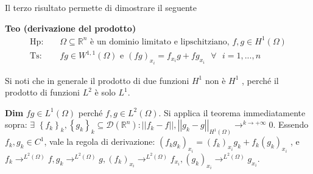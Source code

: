 \documentclass{article}
\begin{document}
Il terzo risultato permette di dimostrare il seguente

\textbf{Teo (derivazione del prodotto)}%
\begin{eqnarray*}
\text{Hp}\text{: } &&\Omega \subseteq 
\mathbb{R}
^{n}\text{ \`{e} un dominio limitato e lipschitziano, }f,g\in H^{1}\left(
\Omega \right) \\
\text{Ts}\text{: } &&fg\in W^{1,1}\left( \Omega \right) \text{ e }\left(
fg\right) _{x_{i}}=f_{x_{i}}g+fg_{x_{i}}\text{ }\forall \text{ }i=1,...,n
\end{eqnarray*}

Si noti che in generale il prodotto di due funzioni $H^{1}$ non \`{e} $H^{1}$%
, perch\'{e} il prodotto di funzioni $L^{2}$ \`{e} solo $L^{1}$.

\textbf{Dim} $fg\in L^{1}\left( \Omega \right) $ perch\'{e} $f,g\in
L^{2}\left( \Omega \right) $. Si applica il teorema immediatamente sopra: $%
\exists $ $\left\{ f_{k}\right\} _{k},\left\{ g_{k}\right\} _{k}\subseteq 
\mathcal{D}\left( 
\mathbb{R}
^{n}\right) :\left\vert \left\vert f_{k}-f\right\vert \right\vert
,\left\vert \left\vert g_{k}-g\right\vert \right\vert _{H^{1}\left( \Omega
\right) }\rightarrow ^{k\rightarrow +\infty }0$. Essendo $f_{k},g_{k}\in
C^{1}$, vale la regola di derivazione: $\left( f_{k}g_{k}\right)
_{x_{i}}=\left( f_{k}\right) _{x_{i}}g_{k}+f_{k}\left( g_{k}\right) _{x_{i}}$%
, e $f_{k}\rightarrow ^{L^{2}\left( \Omega \right) }f,g_{k}\rightarrow
^{L^{2}\left( \Omega \right) }g,\left( f_{k}\right) _{x_{i}}\rightarrow
^{L^{2}\left( \Omega \right) }f_{x_{i}},\left( g_{k}\right)
_{x_{i}}\rightarrow ^{L^{2}\left( \Omega \right) }g_{x_{i}}$.
\end{document}
